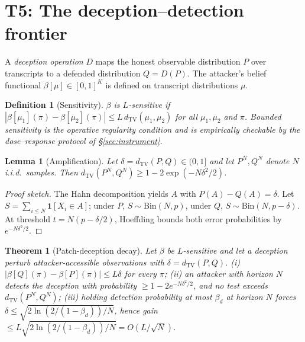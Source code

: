 \documentclass[10pt,twocolumn]{article}
\newtheorem{theorem}{Theorem}
\newtheorem{lemma}{Lemma}
\newtheorem{definition}{Definition}
\newcommand{\TV}{d_{\mathrm{TV}}}
\begin{document}
\section{T5: The deception--detection frontier}\label{sec:t5}

A \emph{deception operation} $D$ maps the honest observable distribution $P$
over transcripts to a defended distribution $Q=D(P)$. The attacker's belief
functional $\beta[\mu]\in[0,1]^K$ is defined on transcript distributions $\mu$.

\begin{definition}[Sensitivity]
$\beta$ is \emph{$L$-sensitive} if
$|\beta[\mu_1](\pi)-\beta[\mu_2](\pi)|\le L\,\TV(\mu_1,\mu_2)$ for all
$\mu_1,\mu_2$ and $\pi$. Bounded sensitivity is the operative regularity
condition and is empirically checkable by the dose--response protocol of
\S\ref{sec:instrument}.
\end{definition}

\begin{lemma}[Amplification]
Let $\delta=\TV(P,Q)\in(0,1]$ and let $P^N,Q^N$ denote $N$ i.i.d.\ samples. Then
$\TV(P^N,Q^N)\ge1-2\exp(-N\delta^2/2)$.
\end{lemma}
\begin{proof}[Proof sketch]
The Hahn decomposition yields $A$ with $P(A)-Q(A)=\delta$. Let
$S=\sum_{i\le N}\mathbf{1}[X_i\in A]$; under $P$, $S\sim\mathrm{Bin}(N,p)$, under
$Q$, $S\sim\mathrm{Bin}(N,p-\delta)$. At threshold $t=N(p-\delta/2)$, Hoeffding
bounds both error probabilities by $e^{-N\delta^2/2}$.
\end{proof}

\begin{theorem}[Patch-deception decay]
Let $\beta$ be $L$-sensitive and let a deception perturb attacker-accessible
observations with $\delta=\TV(P,Q)$.
(i) $|\beta[Q](\pi)-\beta[P](\pi)|\le L\delta$ for every $\pi$;
(ii) an attacker with horizon $N$ detects the deception with probability
$\ge1-2e^{-N\delta^2/2}$, and no test exceeds $\TV(P^N,Q^N)$;
(iii) holding detection probability at most $\beta_d$ at horizon $N$ forces
$\delta\le\sqrt{2\ln(2/(1-\beta_d))/N}$, hence gain
$\le L\sqrt{2\ln(2/(1-\beta_d))/N}=O(L/\sqrt N)$.
\end{theorem}
\end{document}
